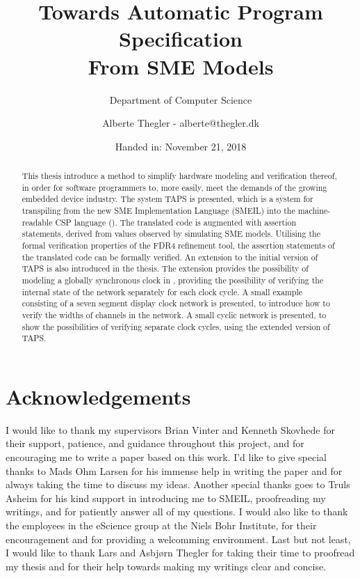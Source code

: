 \documentclass[a4paper]{report}
\author{Alberte Thegler - alberte@thegler.dk}
\title{Towards Automatic Program Specification \\ From SME Models}
\subtitle{Department of Computer Science}
\date{Handed in: November 21, 2018}
\begin{document}
\maketitle



\begin{abstract}
\begin{doublespace}
This thesis introduce a method to simplify hardware modeling and verification
thereof, in order for software programmers to, more easily, meet the demands of
the growing embedded device industry. The system TAPS is presented, which is a
system for transpiling from the new SME Implementation Language (SMEIL) into the
machine-readable CSP language (\cspm{}).
The translated \cspm{} code is augmented with assertion statements, derived from values observed by simulating SME models. Utilising the formal verification
properties of the FDR4 refinement tool, the assertion statements of the
translated \cspm{} code can be formally verified.
An extension to the initial version of TAPS is also introduced in the thesis. The extension provides the possibility of modeling a globally synchronous clock in
\cspm{}, providing the possibility of verifying the internal state of the
\cspm{} network separately for each clock cycle.
A small example consisting of a
seven segment display clock network is presented, to introduce how to verify the
widths of channels in the network. A small cyclic network is presented, to
show the possibilities of verifying separate clock cycles, using the extended
version of TAPS.
\end{doublespace}
\end{abstract}

\chapter*{Acknowledgements}
I would like to thank my supervisors Brian Vinter and Kenneth Skovhede for their support, patience, and guidance throughout this project, and for encouraging me to write a paper based on this work.
I'd like to give special thanks to Mads Ohm Larsen for his immense help in writing the paper and for always taking the time to discuss my ideas.
Another special thanks goes to Truls Asheim for his kind support in introducing me to SMEIL, proofreading my writings, and for patiently answer all of my questions.
I would also like to thank the employees in the eScience group at the Niels Bohr Institute, for their encouragement and for providing a welcomming environment.
Last but not least, I would like to thank Lars and Asbj\o rn Thegler for taking their time to proofread my thesis and for their help towards making my writings clear and concise.
\end{document}
